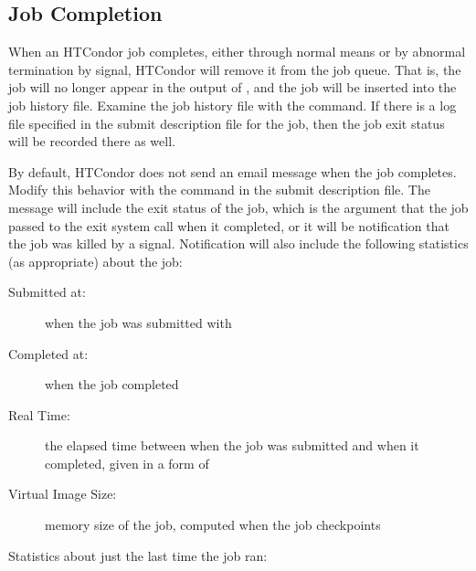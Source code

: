 \subsection{\label{sec:job-completion}Job Completion}

When an HTCondor job completes,
either through normal means or by abnormal termination by signal,
HTCondor will remove it from the job queue.
That is,
the job will no longer appear in the output of ,
and the job will be inserted into the job history file.
Examine the job history file with the  command. 
If there is a log file specified in the submit description file for the job, 
then the job exit status will be recorded there as well.

By default, HTCondor does not send an email message when the job completes.
Modify this behavior with the
 command in the submit description file.
The message will include the exit status of the job,
which is the argument that the job passed to the exit system call 
when it completed,
or it will be notification that the job was killed by a signal.  
Notification will also
include the following statistics (as appropriate) about the job:

\begin{description}

\item[Submitted at:] when the job was submitted with 

\item[Completed at:] when the job completed

\item[Real Time:] the elapsed time between when the job was submitted and
when it completed, given in a form of 

\item[Virtual Image Size:] memory size of the job, computed when the
job checkpoints

\end{description}

Statistics about just the last time the job ran:

